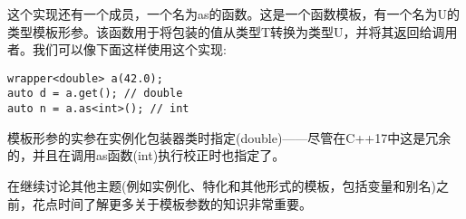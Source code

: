 这个实现还有一个成员，一个名为as的函数。这是一个函数模板，有一个名为U的类型模板形参。该函数用于将包装的值从类型T转换为类型U，并将其返回给调用者。我们可以像下面这样使用这个实现:


\begin{lstlisting}[style=styleCXX]
wrapper<double> a(42.0);
auto d = a.get(); // double
auto n = a.as<int>(); // int
\end{lstlisting}

模板形参的实参在实例化包装器类时指定(double)——尽管在C++17中这是冗余的，并且在调用as函数(int)执行校正时也指定了。

在继续讨论其他主题(例如实例化、特化和其他形式的模板，包括变量和别名)之前，花点时间了解更多关于模板参数的知识非常重要。







